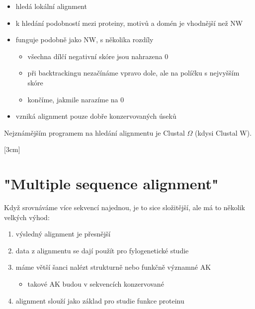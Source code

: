 \documentclass[DIV=8]{scrreprt}
\begin{document}
\begin{itemize}
    \item hledá lokální alignment
    \item k hledání podobností mezi proteiny, motivů a domén je vhodnější než NW
    \item funguje podobně jako NW, s několika rozdíly
\begin{itemize}
    \item všechna dílčí negativní skóre jsou nahrazena 0
    \item při backtrackingu nezačínáme vpravo dole, ale na políčku s nejvyšším skóre
    \item končíme, jakmile narazíme na 0
\end{itemize}

    \item vzniká alignment pouze dobře konzervovaných úseků
\end{itemize}


Nejznámějším programem na hledání alignmentu je Clustal \(\Omega\) (kdysi Clustal W).

[3cm]
\section{"Multiple sequence alignment"}

Když srovnáváme více sekvencí najednou, je to sice složitější, ale má to několik velkých výhod:
\begin{enumerate}
    \item výsledný alignment je přesnější
    \item data z alignmentu se dají použít pro fylogenetické studie
    \item máme větší šanci nalézt strukturně nebo funkčně významné AK
\begin{itemize}
    \item takové AK budou v sekvencích konzervované
\end{itemize}

    \item alignment slouží jako základ pro studie funkce proteinu
\end{enumerate}
\end{document}
